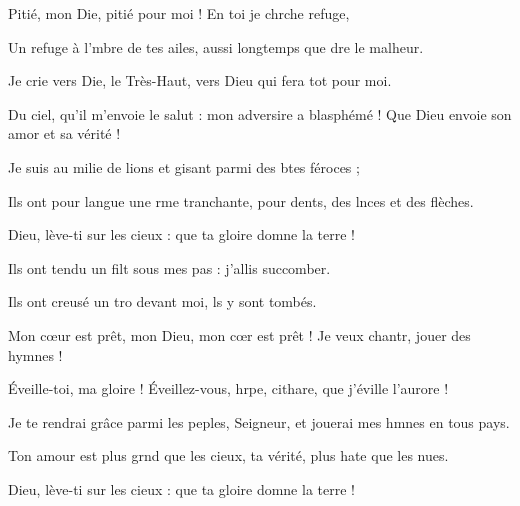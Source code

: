\item Pitié, mon Die, pitié pour moi !\psstar{} En toi je chrche refuge,
\item Un refuge à l’mbre de tes ailes,\psstar{} aussi longtemps que dre le malheur.
\item Je crie vers Die, le Très-Haut,\psstar{} vers Dieu qui fera tot pour moi.
\item Du ciel, qu’il m’envoie le salut :\pscross{} mon adversire a blasphémé !\psstar{} Que Dieu envoie son amor et sa vérité !
\item Je suis au milie de lions\psstar{} et gisant parmi des btes féroces ;
\item Ils ont pour langue une rme tranchante,\psstar{} pour dents, des lnces et des flèches.
\item Dieu, lève-ti sur les cieux :\psstar{} que ta gloire domne la terre !
\item Ils ont tendu un filt sous mes pas :\psstar{} j’allis succomber. 
\item Ils ont creusé un tro devant moi,\psstar{} ls y sont tombés.
\item Mon cœur est prêt, mon Dieu,\pscross{} mon cœr est prêt !\psstar{} Je veux chantr, jouer des hymnes !
\item Éveille-toi, ma gloire !\pscross{} Éveillez-vous, hrpe, cithare,\psstar{} que j’éville l’aurore !
\item Je te rendrai grâce parmi les peples, Seigneur,\psstar{} et jouerai mes hmnes en tous pays.
\item Ton amour est plus grnd que les cieux,\psstar{} ta vérité, plus hate que les nues.
\item Dieu, lève-ti sur les cieux :\psstar{} que ta gloire domne la terre !
